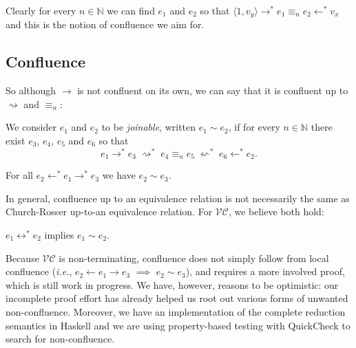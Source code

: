 \documentclass[acmsmall,review,dvipsnames]{acmart}
\newcommand{\Varid}[1]{\mathit{#1}}
\newcommand{\ie}{\emph{i.e.}}	%
\newcommand{\versecalc}{$\mathcal{VC}$}
\newcommand{\movesto}{\longrightarrow}
\newcommand{\movestoX}{\rightsquigarrow}
\newcommand{\movesfromX}{\leftsquigarrow}
\newcommand{\movesfrom}{\longleftarrow}
\newcommand{\convertible}{\longleftrightarrow^{\ast}}
\begin{document}
Clearly for every $n \in \mathbb N$ we can find \ensuremath{\Varid{e}_{\mathrm{1}}} and \ensuremath{\Varid{e}_{\mathrm{2}}} so that \ensuremath{\langle{}\mathrm{1},\Varid{v}_{\Varid{y}}\rangle\movesto^{\ast}\Varid{e}_{\mathrm{1}}\equiv_{n}\Varid{e}_{\mathrm{2}}\movesfrom^{\ast}\Varid{v}_{\Varid{x}}} and this is the notion of confluence we aim for.

\subsection{Confluence}

So although \ensuremath{\to } is not confluent on its own, we can say that it is confluent up to \ensuremath{\movestoX} and \ensuremath{\equiv_{\Varid{n}}}:

\begin{definition}
We consider \ensuremath{\Varid{e}_{\mathrm{1}}} and \ensuremath{\Varid{e}_{\mathrm{2}}} to be \emph{joinable}, written \ensuremath{\Varid{e}_{\mathrm{1}}\mathrel{\sim}\Varid{e}_{\mathrm{2}}}, if for every $n \in \mathbb N$ there exist \ensuremath{\Varid{e}_{\mathrm{3}}}, \ensuremath{\Varid{e}_{\mathrm{4}}}, \ensuremath{\Varid{e}_{\mathrm{5}}} and \ensuremath{\Varid{e}_{\mathrm{6}}} so that
\[
\ensuremath{\Varid{e}_{\mathrm{1}}\movesto^{\ast}\Varid{e}_{\mathrm{3}}\;\movestoX^{\ast}\;\Varid{e}_{\mathrm{4}}\equiv_{n}\Varid{e}_{\mathrm{5}}\;\movesfromX^{\ast}\;\Varid{e}_{\mathrm{6}}\movesfrom^{\ast}\Varid{e}_{\mathrm{2}}}.
\]
\end{definition}

\begin{proposition}[Confluence]
\label{thm:confluence}%
For all \ensuremath{\Varid{e}_{\mathrm{2}}\movesfrom^{\ast}\Varid{e}_{\mathrm{1}}\movesto^{\ast}\Varid{e}_{\mathrm{3}}} we have \ensuremath{\Varid{e}_{\mathrm{2}}\mathrel{\sim}\Varid{e}_{\mathrm{3}}}.
\end{proposition}

In general, confluence up to an equivalence relation is not necessarily the same as Church-Rosser up-to-an equivalence relation. For \versecalc, we believe both hold:

\begin{proposition}
\label{thm:church-rosser}%
\ensuremath{\Varid{e}_{\mathrm{1}}\mathrel{\convertible}\Varid{e}_{\mathrm{2}}} implies \ensuremath{\Varid{e}_{\mathrm{1}}\mathrel{\sim}\Varid{e}_{\mathrm{2}}}.
\end{proposition}

Because {\versecalc} is non-terminating, confluence does not simply follow from local confluence ({\ie}, \ensuremath{\Varid{e}_{\mathrm{2}}\leftarrow \Varid{e}_{\mathrm{1}}\to \Varid{e}_{\mathrm{3}}} $\implies$ \ensuremath{\Varid{e}_{\mathrm{2}}\mathrel{\sim}\Varid{e}_{\mathrm{3}}}), and requires a more involved proof, which is still work in progress.
%
We have, however, reasons to be optimistic: our incomplete proof
effort has already helped us root out various forms of unwanted
non-confluence. Moreover, we have an implementation of the complete
reduction semantics in Haskell and we are using property-based testing
with QuickCheck \citep{quickcheck} to search for non-confluence.
\end{document}
